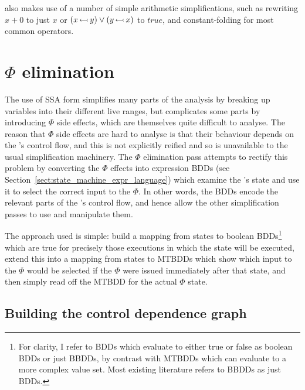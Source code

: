 {\Implementation} also makes use of a number of simple arithmetic
simplifications, such as rewriting $x + 0$ to just $x$ or
$(x\,{\leftarrowtail}\,y) \vee (y\,{\leftarrowtail}\,x)$ to
$\mathit{true}$, and constant-folding for most common operators.

\section{$\Phi$ elimination}
\label{sect:phi_elimination}


The use of SSA form simplifies many parts of the analysis by breaking
up variables into their different live ranges, but complicates some
parts by introducing $\Phi$ side effects, which are themselves quite
difficult to analyse.  The reason that $\Phi$ side effects are hard to
analyse is that their behaviour depends on the {\StateMachine}'s
control flow, and this is not explicitly reified and so is unavailable
to the usual simplification machinery.  The $\Phi$ elimination pass
attempts to rectify this problem by converting the $\Phi$ effects into
expression BDDs (see Section~\ref{sect:state_machine_expr_language})
which examine the {\StateMachine}'s state and use it to select the
correct input to the $\Phi$.  In other words, the BDDs encode the
relevant parts of the {\StateMachine}'s control flow, and hence allow
the other simplification passes to use and manipulate them.

The approach used is simple: build a mapping from {\StateMachine}
states to boolean BDDs\footnote{For clarity, I refer to BDDs which
  evaluate to either true or false as boolean BDDs or just BBDDs, by
  contrast with MTBDDs which can evaluate to a more complex value set.
  Most existing literature refers to BBDDs as just BDDs.}  which are
true for precisely those executions in which the state will be
executed, extend this into a mapping from states to MTBDDs which show
which input to the $\Phi$ would be selected if the $\Phi$ were issued
immediately after that state, and then simply read off the MTBDD for
the actual $\Phi$ state.


\subsection{Building the control dependence graph}

